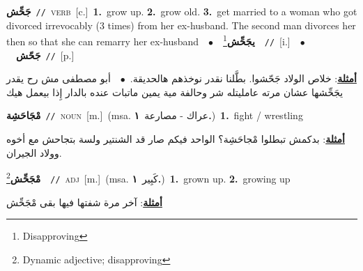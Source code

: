 \documentclass[10pt,a4paper,twoside]{article} %
\begin{document}
\begin{multicols}{2}
{{{{{{{{{\setlength\topsep{0pt}\textbf{\foreignlanguage{arabic}{جَحِّش}}\ {\color{gray}\texttt{//}\color{black}}\ \textsc{verb}\ [c.]\ \textbf{1.}~grow up.  \textbf{2.}~grow old.  \textbf{3.}~get married to a woman who got divorced irrevocably (3 times) from her ex-husband. The second man divorces her then so that she can remarry her ex-husband\ \ $\bullet$\ \ \setlength\topsep{0pt}\textbf{\foreignlanguage{arabic}{يجَحِّش}}\footnote{Disapproving}\ \ {\color{gray}\texttt{//}\color{black}}\ [i.]\ \ $\bullet$\ \ \setlength\topsep{0pt}\textbf{\foreignlanguage{arabic}{جَحّش}}\ {\color{gray}\texttt{//}\color{black}}\ [p.]\  \begin{flushright}\color{gray}\foreignlanguage{arabic}{\textbf{\underline{\foreignlanguage{arabic}{أمثلة}}}: خلاص الولاد جَحّشوا. بطَّلنا نقدر نوخذهم هالحديقة.\ $\bullet$\ \  أبو مصطفى مش رح يقدر يجَحِّشها عشان مرته عامليتله شر وحالفة مية يمين ماتبات عنده بالدار إِذا بيعمل هيك}\end{flushright}\color{black}} \vspace{2mm}

{\setlength\topsep{0pt}\textbf{\foreignlanguage{arabic}{مْجَاحَشِة}}\ {\color{gray}\texttt{//}\color{black}}\ \textsc{noun}\ [m.]\ \color{gray}(msa. \foreignlanguage{arabic}{عراك - مصارعة}~\foreignlanguage{arabic}{\textbf{١.}})\color{black}\ \textbf{1.}~fight / wrestling\  \begin{flushright}\color{gray}\foreignlanguage{arabic}{\textbf{\underline{\foreignlanguage{arabic}{أمثلة}}}: بدكمش تبطلوا مْجاحَشِة؟ الواحد فيكم صار قد الشنتير ولسة بتجاحش مع أخوه وولاد الجيران.}\end{flushright}\color{black}} \vspace{2mm}

{\setlength\topsep{0pt}\textbf{\foreignlanguage{arabic}{مْجَحِّش}}\footnote{Dynamic adjective; disapproving}\ \ {\color{gray}\texttt{//}\color{black}}\ \textsc{adj}\ [m.]\ \color{gray}(msa. \foreignlanguage{arabic}{كَبِير}~\foreignlanguage{arabic}{\textbf{١.}})\color{black}\ \textbf{1.}~grown up.  \textbf{2.}~growing up\  \begin{flushright}\color{gray}\foreignlanguage{arabic}{\textbf{\underline{\foreignlanguage{arabic}{أمثلة}}}: آخر مرة شفتها فيها بقى مْجَحِّش}\end{flushright}\color{black}} \vspace{2mm}

}}}}}}}}
\end{multicols}
\end{document}

